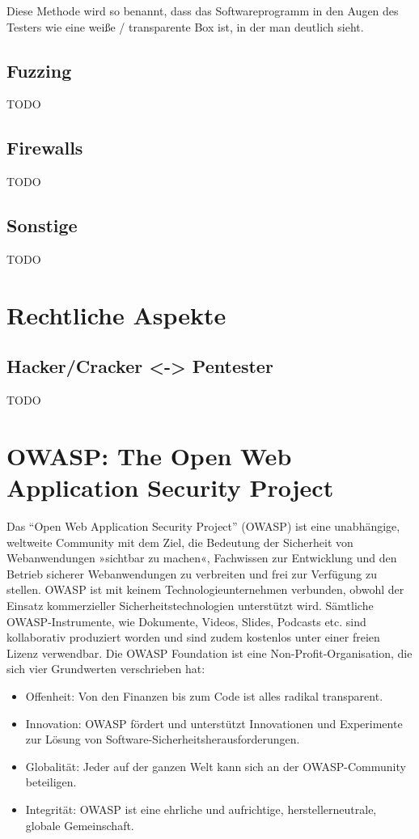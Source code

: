 \documentclass[12pt,oneside,a4paper,parskip]{scrbook}
\begin{document}
Diese Methode wird so benannt, dass das Softwareprogramm in den Augen des Testers wie eine weiße / transparente Box ist, in der man deutlich sieht.

\subsection{Fuzzing}
TODO

\subsection{Firewalls}
TODO

\subsection{Sonstige}
TODO

\section{Rechtliche Aspekte}
\subsection{Hacker/Cracker <-> Pentester}

TODO

\section{OWASP: The Open Web Application Security Project}
Das ``Open Web Application Security Project'' (OWASP) ist eine unabhängige, weltweite Community mit dem Ziel, die Bedeutung der Sicherheit von Webanwendungen »sichtbar zu machen«, Fachwissen zur Entwicklung und den Betrieb sicherer Webanwendungen zu verbreiten und frei zur Verfügung zu stellen.
OWASP ist mit keinem Technologieunternehmen verbunden, obwohl der Einsatz kommerzieller Sicherheitstechnologien unterstützt wird. Sämtliche OWASP-Instrumente, wie Dokumente, Videos, Slides, Podcasts etc. sind kollaborativ produziert worden und sind zudem kostenlos unter einer freien Lizenz verwendbar. Die OWASP Foundation ist eine Non-Profit-Organisation, die sich vier Grundwerten verschrieben hat:

\begin{itemize}
  \item Offenheit: Von den Finanzen bis zum Code ist alles radikal transparent.
  \item Innovation: OWASP fördert und unterstützt Innovationen und Experimente zur Lösung von Software-Sicherheitsherausforderungen.
  \item Globalität: Jeder auf der ganzen Welt kann sich an der OWASP-Community beteiligen.
  \item Integrität: OWASP ist eine ehrliche und aufrichtige, herstellerneutrale, globale Gemeinschaft.
\end{itemize}
\end{document}
